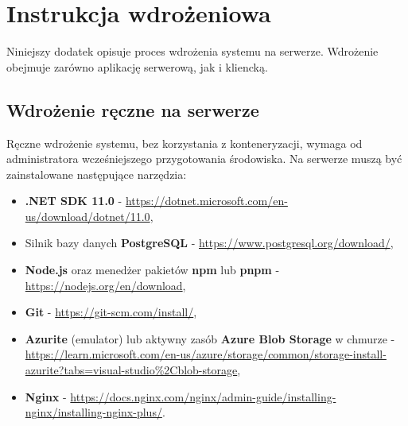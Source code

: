 \chapter{Instrukcja wdrożeniowa}
Niniejszy dodatek opisuje proces wdrożenia systemu na serwerze. Wdrożenie obejmuje zarówno aplikację serwerową, jak i kliencką.

\section{Wdrożenie ręczne na serwerze}
Ręczne wdrożenie systemu, bez korzystania z konteneryzacji, wymaga od administratora wcześniejszego przygotowania środowiska.
Na serwerze muszą być zainstalowane następujące narzędzia:
\begin{itemize}
    \item \textbf{.NET SDK 11.0} - \url{https://dotnet.microsoft.com/en-us/download/dotnet/11.0},
    \item Silnik bazy danych \textbf{PostgreSQL} - \url{https://www.postgresql.org/download/},
    \item \textbf{Node.js} oraz menedżer pakietów \textbf{npm} lub \textbf{pnpm} - \url{https://nodejs.org/en/download},
    \item \textbf{Git} - \url{https://git-scm.com/install/},
    \item \textbf{Azurite} (emulator) lub aktywny zasób \textbf{Azure Blob Storage} w chmurze - \url{https://learn.microsoft.com/en-us/azure/storage/common/storage-install-azurite?tabs=visual-studio%2Cblob-storage},
    \item \textbf{Nginx} - \url{https://docs.nginx.com/nginx/admin-guide/installing-nginx/installing-nginx-plus/}.
\end{itemize}

